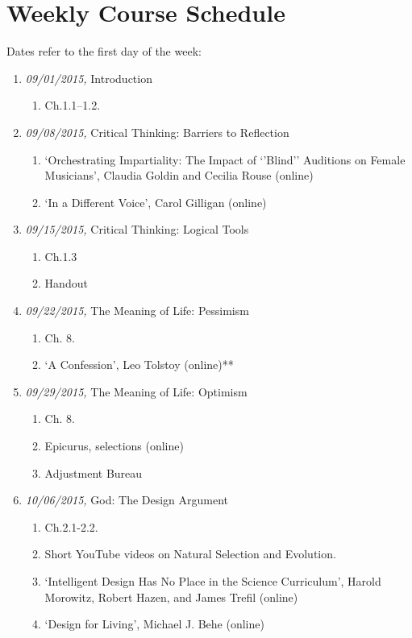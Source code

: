 \documentclass[11pt,article,oneside]{memoir}
\begin{document}
\section{Weekly Course Schedule}
Dates refer to the first day of the week: 
\begin{enumerate}

\item \textit{09/01/2015,} Introduction
\begin{enumerate}
\item Ch.1.1--1.2.
\end{enumerate}

\item \textit{09/08/2015,} Critical Thinking: Barriers to Reflection
\begin{enumerate}
\item `Orchestrating Impartiality: The Impact of `'Blind'' Auditions on Female Musicians',  Claudia Goldin and Cecilia Rouse (online)
\item `In a Different Voice',  Carol Gilligan (online)
\end{enumerate}

\item \textit{09/15/2015,} Critical Thinking: Logical Tools 
\begin{enumerate}
\item Ch.1.3
\item Handout
\end{enumerate}

\item \textit{09/22/2015,} The Meaning of Life: Pessimism 
\begin{enumerate}
\item Ch. 8. 
\item `A Confession', Leo Tolstoy (online)**
\end{enumerate}

\item \textit{09/29/2015,} The Meaning of Life: Optimism
\begin{enumerate}
\item Ch. 8. 
\item Epicurus, selections (online)
\item Adjustment Bureau
\end{enumerate}

\item \textit{10/06/2015,} God: The Design Argument
\begin{enumerate}
\item Ch.2.1-2.2. 
\item Short YouTube videos on Natural Selection and Evolution.
\item `Intelligent Design Has No Place in the Science Curriculum', Harold Morowitz, Robert Hazen, and James Trefil (online)
 \item `Design for Living', Michael J. Behe (online)
 \end{enumerate}
 

\end{enumerate}
\end{document}
